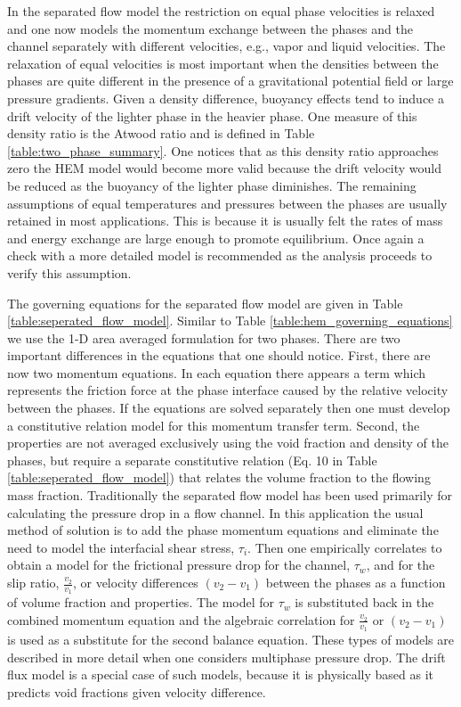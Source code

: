 In the separated flow model the restriction on equal phase velocities is relaxed and one now models the momentum exchange between the phases and the channel separately with different velocities, e.g., vapor and liquid velocities.
The relaxation of equal velocities is most important when the densities between the phases are quite different in the presence of a gravitational potential field or large pressure gradients.
Given a density difference, buoyancy effects tend to induce a drift velocity of the lighter phase in the heavier phase.
One measure of this density ratio is the Atwood ratio and is defined in Table \ref{table:two_phase_summary}.
One notices that as this density ratio approaches zero the HEM model would become more valid because the drift velocity would be reduced as the buoyancy of the lighter phase diminishes.
The remaining assumptions of equal temperatures and pressures between the phases are usually retained in most applications.
This is because it is usually felt the rates of mass and energy exchange are large enough to promote equilibrium.
Once again a check with a more detailed model is recommended as the analysis proceeds to verify this assumption.

The governing equations for the separated flow model are given in Table \ref{table:seperated_flow_model}.
Similar to Table \ref{table:hem_governing_equations} we use the 1-D area averaged formulation for two phases.
There are two important differences in the equations that one should notice.
First, there are now two momentum equations.
In each equation there appears a term which represents the friction force at the phase interface caused by the relative velocity between the phases.
If the equations are solved separately then one must develop a constitutive relation model for this momentum transfer term.
Second, the properties are not averaged exclusively using the void fraction and density of the phases, but require a separate constitutive relation (Eq. 10 in Table \ref{table:seperated_flow_model}) that relates the volume fraction to the flowing mass fraction.
Traditionally the separated flow model has been used primarily for calculating the pressure drop in a flow channel.
In this application the usual method of solution is to add the phase momentum equations and eliminate the need to model the interfacial shear stress, $\tau_i$.
Then one empirically correlates to obtain a model for the frictional pressure drop for the channel, $\tau_w$, and for the slip ratio, $\frac{v_2}{v_1}$, or velocity differences $(v_2-v_1)$ between the phases as a function of volume fraction and properties.
The model for $\tau_w$ is substituted back in the combined momentum equation and the algebraic correlation for $\frac{v_2}{v_1}$ or $(v_2-v_1)$ is used as a substitute for the second balance equation.
These types of models are described in more detail when one considers multiphase pressure drop.
The drift flux model is a special case of such models, because it is physically based as it predicts void fractions given velocity difference.

